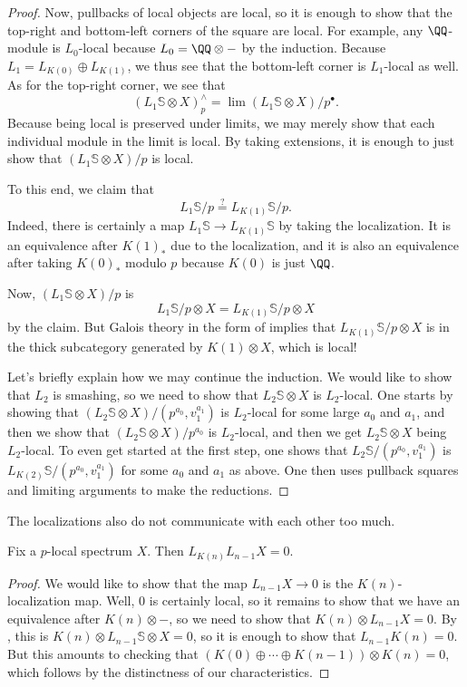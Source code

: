 \documentclass[../notes.tex]{subfiles}
\begin{document}
\begin{proof}
	Now, pullbacks of local objects are local, so it is enough to show that the top-right and bottom-left corners of the square are local. For example, any $\QQ$-module is $L_0$-local because $L_0=\QQ\otimes-$ by the induction. Because $L_1=L_{K(0)}\oplus L_{K(1)}$, we thus see that the bottom-left corner is $L_1$-local as well. As for the top-right corner, we see that
	\[(L_1\mathbb S\otimes X)^\land_p=\lim (L_1\mathbb S\otimes X)/p^\bullet.\]
	Because being local is preserved under limits, we may merely show that each individual module in the limit is local. By taking extensions, it is enough to just show that $(L_1\mathbb S\otimes X)/p$ is local.
	
	To this end, we claim that
	\[L_1\mathbb S/p\stackrel?=L_{K(1)}\mathbb S/p.\]
	Indeed, there is certainly a map $L_1\mathbb S\to L_{K(1)}\mathbb S$ by taking the localization. It is an equivalence after $K(1)_*$ due to the localization, and it is also an equivalence after taking $K(0)_*$ modulo $p$ because $K(0)$ is just $\QQ$.

	Now, $(L_1\mathbb S\otimes X)/p$ is
	\[L_1\mathbb S/p\otimes X=L_{K(1)}\mathbb S/p\otimes X\]
	by the claim. But Galois theory in the form of  implies that $L_{K(1)}\mathbb S/p\otimes X$ is in the thick subcategory generated by $K(1)\otimes X$, which is local!

	Let's briefly explain how we may continue the induction. We would like to show that $L_2$ is smashing, so we need to show that $L_2\mathbb S\otimes X$ is $L_2$-local. One starts by showing that $(L_2\mathbb S\otimes X)/(p^{a_0},v_1^{a_1})$ is $L_2$-local for some large $a_0$ and $a_1$, and then we show that $(L_2\mathbb S\otimes X)/p^{a_0}$ is $L_2$-local, and then we get $L_2\mathbb S\otimes X$ being $L_2$-local. To even get started at the first step, one shows that $L_2\mathbb S/(p^{a_0},v_1^{a_1})$ is $L_{K(2)}\mathbb S/(p^{a_0},v_1^{a_1})$ for some $a_0$ and $a_1$ as above. One then uses pullback squares and limiting arguments to make the reductions.
\end{proof}
The localizations also do not communicate with each other too much.
\begin{corollary}
	Fix a $p$-local spectrum $X$. Then $L_{K(n)}L_{n-1}X=0$.
\end{corollary}
\begin{proof}
	We would like to show that the map $L_{n-1}X\to0$ is the $K(n)$-localization map. Well, $0$ is certainly local, so it remains to show that we have an equivalence after $K(n)\otimes-$, so we need to show that $K(n)\otimes L_{n-1}X=0$. By , this is $K(n)\otimes L_{n-1}\mathbb S\otimes X=0$, so it is enough to show that $L_{n-1}K(n)=0$. But this amounts to checking that $(K(0)\oplus\cdots\oplus K(n-1))\otimes K(n)=0$, which follows by the distinctness of our characteristics.
\end{proof}
\end{document}
